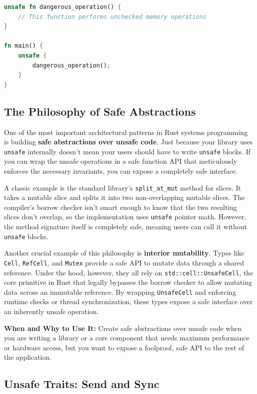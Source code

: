 \begin{lstlisting}[language=Rust]
unsafe fn dangerous_operation() {
    // This function performs unchecked memory operations
}

fn main() {
    unsafe {
        dangerous_operation();
    }
}
\end{lstlisting}

\subsection{The Philosophy of Safe Abstractions}

One of the most important architectural patterns in Rust systems programming is building \textbf{safe abstractions over unsafe code}. Just because your library uses \texttt{unsafe} internally doesn't mean your users should have to write \texttt{unsafe} blocks. If you can wrap the unsafe operations in a safe function API that meticulously enforces the necessary invariants, you can expose a completely safe interface.

A classic example is the standard library's \texttt{split\_at\_mut} method for slices. It takes a mutable slice and splits it into two non-overlapping mutable slices. The compiler's borrow checker isn't smart enough to know that the two resulting slices don't overlap, so the implementation uses \texttt{unsafe} pointer math. However, the method signature itself is completely safe, meaning users can call it without \texttt{unsafe} blocks.

Another crucial example of this philosophy is \textbf{interior mutability}. Types like \texttt{Cell}, \texttt{RefCell}, and \texttt{Mutex} provide a safe API to mutate data through a shared reference. Under the hood, however, they all rely on \texttt{std::cell::UnsafeCell}, the core primitive in Rust that legally bypasses the borrow checker to allow mutating data across an immutable reference. By wrapping \texttt{UnsafeCell} and enforcing runtime checks or thread synchronization, these types expose a safe interface over an inherently unsafe operation.

\textbf{When and Why to Use It:} Create safe abstractions over unsafe code when you are writing a library or a core component that needs maximum performance or hardware access, but you want to expose a foolproof, safe API to the rest of the application.

\subsection{Unsafe Traits: Send and Sync}

